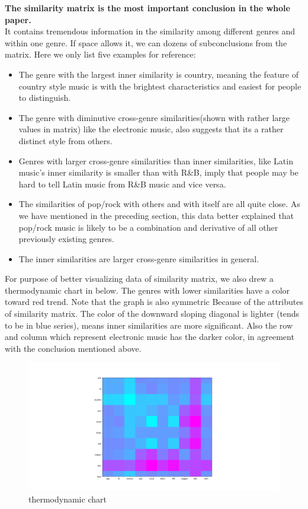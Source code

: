 \documentclass[12pt]{article}
\begin{document}
\textbf{The similarity matrix is the most important conclusion in the whole paper.} \\

It contains tremendous information in the similarity among different genres and within one genre.  
If space allows it, we can dozens of subconclusions from the matrix.
Here we only list five examples for reference: 
\begin{itemize}
\item The genre with the largest inner similarity is country, meaning the feature of country style music is with the brightest characteristics and easiest for people to distinguish.
\item The genre with diminutive cross-genre similarities(shown with rather large values in matrix) like the electronic music, also suggests that its a rather distinct style from others.
\item Genres with larger cross-genre similarities than inner similarities, like Latin music's inner similarity is smaller than with R\&B, imply that people may be hard to tell Latin music from R\&B music and vice versa. 
\item The similarities of pop/rock with others and with itself are all quite close. As we have mentioned in the preceding section, this data better explained that pop/rock music is likely to be a combination and derivative of all other previously existing genres.
\item The inner similarities are larger cross-genre similarities in general.
\end{itemize}

For purpose of better visualizing data of similarity matrix, we also drew a thermodynamic chart in below. The genres with lower similarities have a color toward red trend.
Note that the graph is also symmetric Because of the attributes of similarity matrix. 
The color of the downward sloping diagonal is lighter (tends to be in blue series), means inner similarities are more significant. Also the row and column which represent electronic music has the darker color, in agreement with the conclusion mentioned above. 

 \begin{figure}[h]
\centering
\includegraphics[width=12cm]{thermodynamic chart.png}
\caption{thermodynamic chart}
\end{figure}
\end{document}
